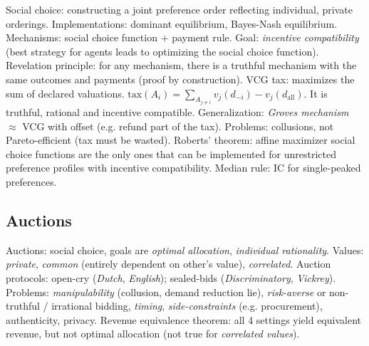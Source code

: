 \documentclass[10pt,a4paper,landscape]{article}
\newcommand{\concept}[1]{\textcolor{Emerald}{#1}} %
\newcommand{\subconcept}[1]{\textit{#1}}
\begin{document}
\begin{multicols*}{4}
\concept{Social choice}: constructing a joint preference order reflecting individual, private orderings. Implementations: dominant equilibrium, Bayes-Nash equilibrium.
\concept{Mechanisms}: social choice function $+$ payment rule. Goal: \subconcept{incentive compatibility} (best strategy for agents leads to optimizing the social choice function).
\concept{Revelation principle}: for any mechanism, there is a truthful mechanism with the same outcomes and payments (proof by construction).
\concept{VCG tax}: maximizes the sum of declared valuations. $\text{tax}(A_i) = \sum_{A_{j \neq i}} v_j(d_{-i}) - v_j(d_{\text{all}})$. It is truthful, rational and incentive compatible. Generalization: \subconcept{Groves mechanism} $\approx$ VCG with offset (e.g. refund part of the tax). Problems: collusions, not Pareto-efficient (tax must be wasted).
\concept{Roberts' theorem}: affine maximizer social choice functions are the only ones that can be implemented for unrestricted preference profiles with incentive compatibility.
\concept{Median rule}: IC for single-peaked preferences.

\subsection{Auctions}

\concept{Auctions}: social choice, goals are \subconcept{optimal allocation}, \subconcept{individual rationality}.
\concept{Values}: \subconcept{private}, \subconcept{common} (entirely dependent on other's value), \subconcept{correlated}.
\concept{Auction protocols}: open-cry (\subconcept{Dutch}, \subconcept{English}); sealed-bids (\subconcept{Discriminatory}, \subconcept{Vickrey}). Problems: \subconcept{manipulability} (collusion, demand reduction lie), \subconcept{risk-averse} or non-truthful / irrational bidding, \subconcept{timing}, \subconcept{side-constraints} (e.g. procurement), authenticity, privacy.
\concept{Revenue equivalence theorem}: all 4 settings yield equivalent revenue, but not optimal allocation (not true for \subconcept{correlated values}).


\end{multicols*}
\end{document}
